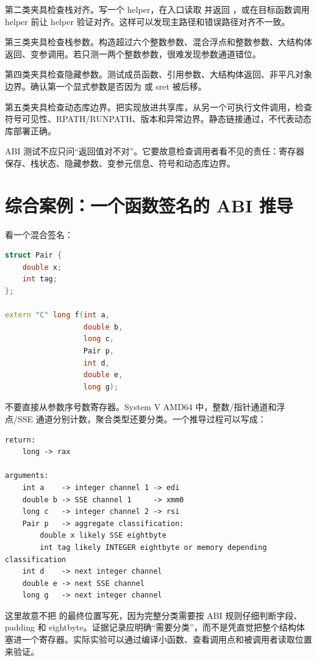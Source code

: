 第二类夹具检查栈对齐。写一个 helper，在入口读取  并返回 ，或在目标函数调用 helper 前让 helper 验证对齐。这样可以发现主路径和错误路径对齐不一致。

第三类夹具检查栈参数。构造超过六个整数参数、混合浮点和整数参数、大结构体返回、变参调用。若只测一两个整数参数，很难发现参数通道错位。

第四类夹具检查隐藏参数。测试成员函数、引用参数、大结构体返回、非平凡对象边界。确认第一个显式参数是否因为  或 sret 被后移。

第五类夹具检查动态库边界。把实现放进共享库，从另一个可执行文件调用，检查符号可见性、RPATH/RUNPATH、版本和异常边界。静态链接通过，不代表动态库部署正确。

\begin{keyidea}
ABI 测试不应只问“返回值对不对”。它要故意检查调用者看不见的责任：寄存器保存、栈状态、隐藏参数、变参元信息、符号和动态库边界。
\end{keyidea}

\section{综合案例：一个函数签名的 ABI 推导}

看一个混合签名：

\begin{lstlisting}[language=C++]
struct Pair {
    double x;
    int tag;
};

extern "C" long f(int a,
                  double b,
                  long c,
                  Pair p,
                  int d,
                  double e,
                  long g);
\end{lstlisting}

不要直接从参数序号数寄存器。System V AMD64 中，整数/指针通道和浮点/SSE 通道分别计数，聚合类型还要分类。一个推导过程可以写成：

\begin{lstlisting}
return:
    long -> rax

arguments:
    int a    -> integer channel 1 -> edi
    double b -> SSE channel 1     -> xmm0
    long c   -> integer channel 2 -> rsi
    Pair p   -> aggregate classification:
        double x likely SSE eightbyte
        int tag likely INTEGER eightbyte or memory depending classification
    int d    -> next integer channel
    double e -> next SSE channel
    long g   -> next integer channel
\end{lstlisting}

这里故意不把  的最终位置写死，因为完整分类需要按 ABI 规则仔细判断字段、padding 和 eightbyte。证据记录应明确“需要分类”，而不是凭直觉把整个结构体塞进一个寄存器。实际实验可以通过编译小函数、查看调用点和被调用者读取位置来验证。

